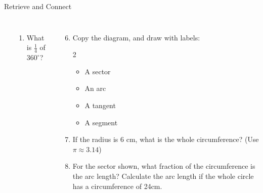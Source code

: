 \documentclass{beamer}
\newcommand{\ashow}[1]{\uncover<2->{\textcolor{red}{\small #1}}}
\begin{document}
\begin{frame}{Retrieve and Connect}
\begin{columns}
\begin{center}
\begin{tikzpicture}[scale=1]
\end{tikzpicture}

\end{center}


\small
\begin{enumerate}
  \item What is $\frac{1}{4}$ of $360^\circ$? \ashow{$90^\circ$}
\end{enumerate}

\begin{enumerate}
  \setcounter{enumi}{5}
  \item Copy the diagram, and draw with labels:
    \begin{multicols}{2}
    \begin{itemize}
      \item A sector
      \item An arc
      \item A tangent
      \item A segment
    \end{itemize}
    \end{multicols}
  \item If the radius is $6$ cm, what is the whole circumference? (Use $\pi \approx 3.14$) \ashow{$37.68$ cm}
  \item For the sector shown, what fraction of the circumference is the arc length? Calculate the arc length if the whole circle has a circumference of 24cm. \ashow{$\frac{1}{6}$; $4$ cm}

\end{enumerate}

\end{columns}
\end{frame}
\end{document}
